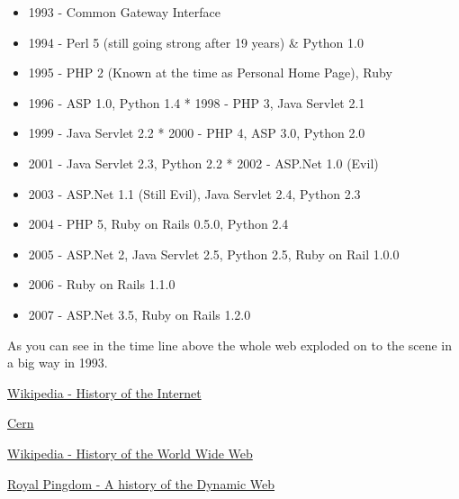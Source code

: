 \documentclass{book}
\begin{document}
\begin{itemize}
\item 1993 - Common Gateway Interface 
\item 1994 - Perl 5 (still going strong after 19 years) \& Python 1.0 
\item 1995 - PHP 2 (Known at the time as Personal Home Page), Ruby 
\item 1996 - ASP 1.0, Python 1.4 * 1998 - PHP 3, Java Servlet 2.1 
\item 1999 - Java Servlet 2.2 * 2000 - PHP 4, ASP 3.0, Python 2.0
\item 2001 - Java Servlet 2.3, Python 2.2 * 2002 - ASP.Net 1.0 (Evil)
\item 2003 - ASP.Net 1.1 (Still Evil), Java Servlet 2.4, Python 2.3 
\item 2004 - PHP 5, Ruby on Rails 0.5.0, Python 2.4 
\item 2005 - ASP.Net 2, Java Servlet 2.5, Python 2.5, Ruby on Rail 1.0.0 
\item 2006 - Ruby on Rails 1.1.0
\item 2007 - ASP.Net 3.5, Ruby on Rails 1.2.0
\end{itemize}

As you can see in the time line above the whole web exploded on to the scene in a big way in 1993.


\begin{thebibliography}{56}
\href{http://en.wikipedia.org/wiki/History_of_the_Internet}{Wikipedia - History of the Internet}

\href{http://info.cern.ch/}{Cern}

\href{http://en.wikipedia.org/wiki/History_of_the_World_Wide_Web}{Wikipedia - History of the World Wide Web}

\href{http://royal.pingdom.com/2007/12/07/a-history-of-the-dynamic-web/}{Royal Pingdom - A history of the Dynamic Web}
\end{thebibliography}
\end{document}
